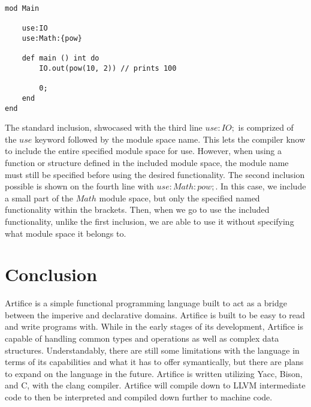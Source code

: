 \documentclass{article}
\begin{document}
\begin{lstlisting}
mod Main

	use:IO
	use:Math:{pow}

	def main () int do
		IO.out(pow(10, 2)) // prints 100

		0;
	end
end
\end{lstlisting}

The standard inclusion, shwocased with the third line $use:IO;$ is comprized of the $use$ keyword followed by the module space name. This lets the compiler know to include the
entire specified module space for use. However, when using a function or structure defined in the included module space, the module name must still be specified before using the desired
functionality. The second inclusion possible is shown on the fourth line with $use:Math:{pow};$. In this case, we include a small part of the $Math$ module space, but only the specified
named functionality within the brackets. Then, when we go to use the included functionality, unlike the first inclusion, we are able to use it without specifying what module space it belongs
to.


\section{Conclusion}

Artifice is a simple functional programming language built to act as a bridge between the imperive and declarative domains. Artifice is built to be easy to read and write programs with. While
in the early stages of its development, Artifice is capable of handling common types and operations as well as complex data structures. Understandably, there are still some limitations
with the language in terms of its capabilities and what it has to offer symantically, but there are plans to expand on the language in the future.
Artifice is written utilizing Yacc, Bison, and C, with the clang compiler. Artifice will compile down to LLVM intermediate code to then be interpreted and compiled down further
to machine code.
\end{document}
